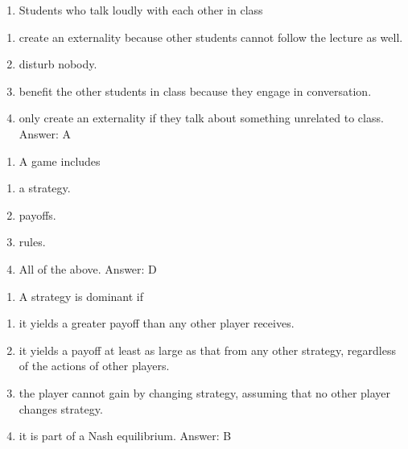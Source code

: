 \documentclass[11pt,]{article}
\providecommand{\tightlist}{%
  \setlength{\itemsep}{0pt}\setlength{\parskip}{0pt}}
\begin{document}
\begin{enumerate}
\def\labelenumi{\arabic{enumi})}
\setcounter{enumi}{14}
\tightlist
\item
  Students who talk loudly with each other in class
\end{enumerate}

\begin{enumerate}
\def\labelenumi{\Alph{enumi})}
\tightlist
\item
  create an externality because other students cannot follow the lecture
  as well.
\item
  disturb nobody.
\item
  benefit the other students in class because they engage in
  conversation.
\item
  only create an externality if they talk about something unrelated to
  class. Answer: A
\end{enumerate}

\begin{enumerate}
\def\labelenumi{\arabic{enumi})}
\setcounter{enumi}{15}
\tightlist
\item
  A game includes
\end{enumerate}

\begin{enumerate}
\def\labelenumi{\Alph{enumi})}
\tightlist
\item
  a strategy.
\item
  payoffs.
\item
  rules.
\item
  All of the above. Answer: D
\end{enumerate}

\begin{enumerate}
\def\labelenumi{\arabic{enumi})}
\setcounter{enumi}{16}
\tightlist
\item
  A strategy is dominant if
\end{enumerate}

\begin{enumerate}
\def\labelenumi{\Alph{enumi})}
\tightlist
\item
  it yields a greater payoff than any other player receives.
\item
  it yields a payoff at least as large as that from any other strategy,
  regardless of the actions of other players.
\item
  the player cannot gain by changing strategy, assuming that no other
  player changes strategy.
\item
  it is part of a Nash equilibrium. Answer: B
\end{enumerate}
\end{document}
